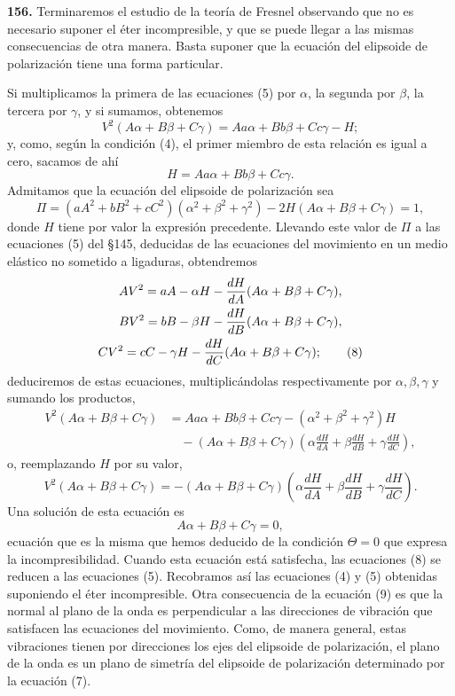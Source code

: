 \noindent\textbf{156.} Terminaremos el estudio de la teoría de Fresnel
observando que no es necesario suponer el éter incompresible, y que se
puede llegar a las mismas consecuencias de otra manera. Basta suponer que
la ecuación del elipsoide de polarización tiene una forma particular.

Si multiplicamos la primera de las ecuaciones (5) por $\alpha$, la segunda
por $\beta$, la tercera por $\gamma$, y si sumamos, obtenemos
\[
V^2(A\alpha+B\beta+C\gamma)=Aa\alpha+Bb\beta+Cc\gamma-H;
\]
y, como, según la condición (4), el primer miembro de esta relación es
igual a cero, sacamos de ahí
\[
H=Aa\alpha+Bb\beta+Cc\gamma.
\]
Admitamos que la ecuación del elipsoide de polarización sea
\begin{equation}
\Pi=(aA^2+bB^2+cC^2)(\alpha^2+\beta^2+\gamma^2)-2H(A\alpha+B\beta+C\gamma)=1,
\tag{7}
\end{equation}
donde $H$ tiene por valor la expresión precedente. Llevando este valor de
$\Pi$ a las ecuaciones (5) del §145, deducidas de las
ecuaciones del movimiento en un medio elástico no sometido a ligaduras,
obtendremos
\begin{gather}
AV^2=aA-\alpha H-\frac{dH}{dA}(A\alpha+B\beta+C\gamma),\notag\\
BV^2=bB-\beta H-\frac{dH}{dB}(A\alpha+B\beta+C\gamma),\notag\\
CV^2=cC-\gamma H-\frac{dH}{dC}(A\alpha+B\beta+C\gamma);
\tag{8}
\end{gather}
deduciremos de estas ecuaciones, multiplicándolas respectivamente por
$\alpha,\beta,\gamma$ y sumando los productos,
\begin{align*}
V^2(A\alpha+B\beta+C\gamma)&=Aa\alpha+Bb\beta+Cc\gamma-(\alpha^2+\beta^2+\gamma^2)H\\
&\quad-(A\alpha+B\beta+C\gamma)\left(\alpha\frac{dH}{dA}+\beta\frac{dH}{dB}+\gamma\frac{dH}{dC}\right),
\end{align*}
o, reemplazando $H$ por su valor,
\[
V^2(A\alpha+B\beta+C\gamma)=
-(A\alpha+B\beta+C\gamma)\left(\alpha\frac{dH}{dA}+\beta\frac{dH}{dB}+\gamma\frac{dH}{dC}\right).
\]
Una solución de esta ecuación es
\begin{equation}
A\alpha+B\beta+C\gamma=0,
\tag{9}
\end{equation}
ecuación que es la misma que hemos deducido de la condición $\Theta=0$ que
expresa la incompresibilidad. Cuando esta ecuación está satisfecha, las
ecuaciones (8) se reducen a las ecuaciones (5). Recobramos así las
ecuaciones (4) y (5) obtenidas suponiendo el éter incompresible. Otra
consecuencia de la ecuación (9) es que la normal al plano de la onda es
perpendicular a las direcciones de vibración que satisfacen las
ecuaciones del movimiento. Como, de manera general, estas vibraciones
tienen por direcciones los ejes del elipsoide de polarización, el plano de
la onda es un plano de simetría del elipsoide de polarización determinado
por la ecuación (7).

